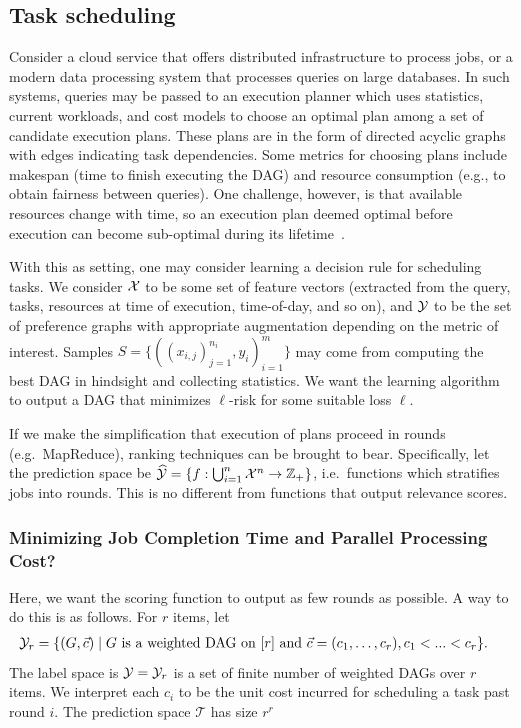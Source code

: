 
\subsection{Task scheduling}
Consider a cloud service that offers distributed infrastructure to process
jobs, or a modern data processing system that processes queries on large
databases.
In such systems, queries may be passed to an execution planner
which uses statistics, current workloads, and cost models to choose an optimal
plan among a set of candidate execution plans.
These plans are in the form of directed acyclic graphs with edges indicating
task dependencies.
Some metrics for choosing plans include makespan (time to finish executing
the DAG) and resource consumption (e.g., to obtain fairness between queries).
One challenge, however, is that available resources change with time,
so an execution plan deemed optimal before execution can become sub-optimal
during its lifetime~\cite{mahajan2018qoop}.

With this as setting, one may consider learning a decision rule for
scheduling tasks.
We consider ${\mathcal X}$ to be some set of feature vectors
(extracted from the query, tasks, resources at time of execution,
time-of-day, and so on), and ${\mathcal Y}$ to be the set of preference graphs with
appropriate augmentation depending on the metric of interest. Samples
$S = \{((x_{i,j})_{j=1}^{n_i}, y_i)_{i=1}^m\}$ may come from computing the best DAG
in hindsight and collecting statistics. We want the learning algorithm to
output a DAG that minimizes $\ell$-risk for some suitable loss $\ell$.

If we make the simplification that execution of plans proceed in rounds (e.g.\
MapReduce), ranking techniques can be brought to bear. Specifically,
let the prediction space be
$\widehat{\mathcal{Y}} = \{f: \bigcup_{i=1}^n {\mathcal X}^n \to \mathbb{Z}_+\}$,
i.e.\ functions which stratifies jobs into rounds. This is no different from
functions that output relevance scores.

\subsubsection{Minimizing Job Completion Time and Parallel Processing Cost?}
Here, we want the scoring function to output as few rounds as possible.
A way to do this is as follows. For $r$ items, let
\begin{align*}
  {\mathcal Y}_r &= \{ (G, \vec{c})
  \mid \text{$G$ is a weighted DAG on $[r]$ and $\vec{c} =( c_1, \ldots, c_r), c_1< ...< c_r$}
  \}.
\end{align*}
The label space is ${\mathcal Y} = {\mathcal Y}_r$ is a set of finite number of weighted DAGs over $r$ items. We interpret each $c_i$
to be the unit cost incurred for scheduling a task past round $i$.  The prediction space $\mathcal{T}$ has size $r^r$

